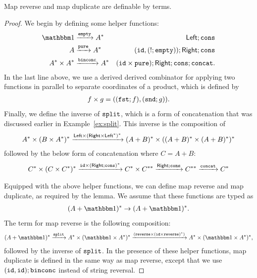 \begin{lemma}\label{lem:terms-define-map-reverse-duplicate}
   Map reverse and map duplicate are definable by terms.
\end{lemma}
\begin{proof}
    We begin by defining some helper functions:
            \begin{align*}
        \onetype & \xrightarrow \emptyterm A^*  & \leftterm; \consterm \\ 
        A & \xrightarrow \pureterm A^* & (\idterm, (!;\emptyterm));\rightterm;\consterm\\
        A^* \times A^* & \xrightarrow \binconcterm A^* & (\idterm \times \pureterm); \rightterm; \consterm; \concatterm .
        \end{align*}
    In the last line above,  we  use a derived derived combinator for applying two functions in parallel to separate coordinates of a product, which is defined by
    \begin{align*}
    f \times g = ((\mathtt{fst};f),(\mathtt{snd};g)).
    \end{align*}
    Finally, we define the inverse of $\mathtt{split}$, which is a form of concatenation that was discussed earlier in Example~\ref{ex:split}. This inverse is the composition of 
    \begin{align*}
    A^* \times (B \times A^*)^* \xrightarrow{\mathsf{Left} \times (\mathsf{Right} \times \mathsf{Left}^*)^*} (A+B)^* \times ((A+B)^* \times (A+B)^*)^*
    \end{align*}
    followed by the below form of concatenation where $C = A+B$:
    \begin{align*}
    C^* \times (C \times C^*)^* \xrightarrow{ \mathtt{id} \times (\mathsf{Right}; \mathtt{cons})^*} C^* \times C^{**} \xrightarrow{\mathsf{Right};\mathtt{cons}} C^{**} \xrightarrow {\mathtt{concat}} C^*
    \end{align*}

    Equipped with the above helper functions, we can define map reverse and map duplicate, as required by the lemma.
    We assume that these functions are typed as 
    \begin{align*}
    (A + \onetype)^* \to (A + \onetype)^*.
    \end{align*}
    The term for map reverse is the following composition:
    \begin{align*}
    (A + \onetype)^* \xrightarrow{\splitterm} A^* \times (\onetype \times A^*)^* \xrightarrow{(\reverseterm \times (\idterm \times \reverseterm)^*)} A^* \times (\onetype \times A^*)^*,
    \end{align*}
    followed by the inverse of $\mathtt{split}$. In the presence of these helper functions, map duplicate is defined in the same way as map reverse, except that we use $(\mathtt{id},\mathtt{id});\mathtt{binconc}$ instead of string reversal.
\end{proof}

